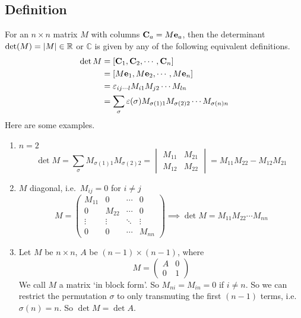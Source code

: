 \subsection{Definition}
For an \(n \times n\) matrix \(M\) with columns \(\vb C_a = M\vb e_a\), then the determinant \(\det(M) = \abs{M} \in \mathbb R\) or \(\mathbb C\) is given by any of the following equivalent definitions.
\begin{align*}
	\det M
	 & = [\vb C_1, \vb C_2, \cdots, \vb C_n]                                                \\
	 & = [M\vb e_1, M\vb e_2, \cdots, M\vb e_n]                                             \\
	 & = \varepsilon_{ij\cdots l}M_{i1}M_{j2} \cdots M_{l n}                                \\
	 & = \sum_\sigma \varepsilon(\sigma) M_{\sigma(1)1}M_{\sigma(2)2} \cdots M_{\sigma(n)n}
\end{align*}
Here are some examples.
\begin{enumerate}
	\item \(n=2\)
	      \[
		      \det M = \sum_\sigma M_{\sigma(1)1}M_{\sigma(2)2} = \begin{vmatrix}
			      M_{11} & M_{21} \\ M_{12} & M_{22}
		      \end{vmatrix} = M_{11}M_{22} - M_{12}M_{21}
	      \]
	\item \(M\) diagonal, i.e.\ \(M_{ij} = 0\) for \(i \neq j\)
	      \[
		      M = \begin{pmatrix}
			      M_{11} & 0      & \cdots & 0      \\
			      0      & M_{22} & \cdots & 0      \\
			      \vdots & \vdots & \ddots & \vdots \\
			      0      & 0      & \cdots & M_{nn}
		      \end{pmatrix} \implies \det M = M_{11}M_{22}\cdots M_{nn}
	      \]
	\item Let \(M\) be \(n\times n\), \(A\) be \((n-1) \times (n-1)\), where
	      \[
		      M = \left( \begin{array}{c|c}
				      A & 0 \\\hline
				      0 & 1
			      \end{array} \right)
	      \]
	      We call \(M\) a matrix `in block form'.
	      So \(M_{ni} = M_{in} = 0\) if \(i \neq n\).
	      So we can restrict the permutation \(\sigma\) to only transmuting the first \((n-1)\) terms, i.e.\ \(\sigma(n) = n\).
	      So \(\det M = \det A\).
\end{enumerate}

